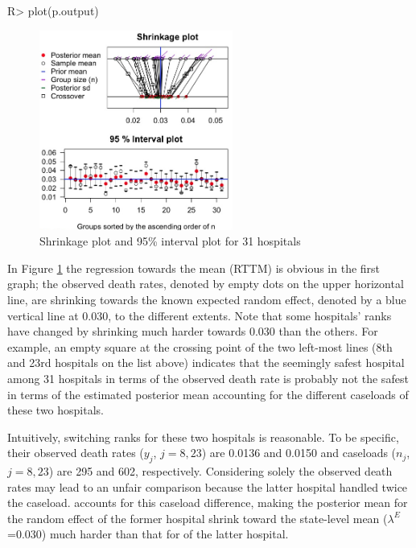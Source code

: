 \documentclass[article]{jss}
\begin{document}
\begin{CodeChunk}
\begin{CodeInput}
R> plot(p.output)
\end{CodeInput}
\end{CodeChunk}
\begin{figure}[h]
\begin{center}
\includegraphics[width = 2.5in]{hospital1.png}
\caption{Shrinkage plot and 95\% interval plot for 31 hospitals}
\label{fig:hospshr}
\end{center}
\end{figure}

In Figure \ref{fig:hospshr} the regression towards the mean (RTTM) is obvious in the first graph; the observed death rates, denoted by empty dots on the upper horizontal line, are shrinking towards the known expected random effect, denoted by a blue vertical line at 0.030, to the different extents. Note that some hospitals' ranks have changed by shrinking much harder towards 0.030 than the others. For example, an empty square at the crossing point of the two left-most lines (8th and 23rd hospitals on the list above) indicates that  the seemingly safest hospital among 31 hospitals in terms of the observed death rate is probably not the safest in terms of the estimated posterior mean accounting for the different caseloads of these two hospitals. 


Intuitively, switching ranks for these two hospitals is reasonable. To be specific, their observed death rates ($y_{j}$, $j=8, 23$) are 0.0136 and 0.0150 and caseloads ($n_{j}$, $j=8, 23$) are 295 and 602, respectively. Considering solely the observed death rates may lead to an unfair comparison because the latter hospital handled twice the caseload.  accounts for this caseload difference, making the posterior mean for the random effect of the former hospital shrink toward the state-level mean ($\lambda^E$=0.030) much harder than that for of the latter hospital.
\end{document}
